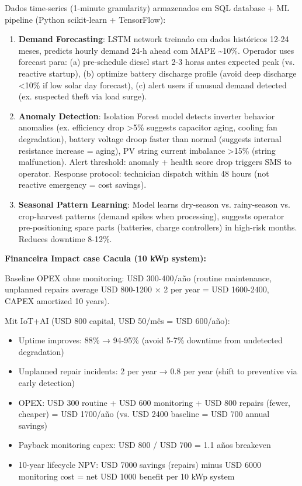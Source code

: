 \documentclass[12pt, a4paper]{article}
\begin{document}
Dados time-series (1-minute granularity) armazenados em SQL database + ML pipeline (Python scikit-learn + TensorFlow):
\begin{enumerate}
\item\textbf{Demand Forecasting}: LSTM network treinado em dados históricos 12-24 meses, predicts hourly demand 24-h ahead com MAPE \textasciitilde{}10\%. Operador uses forecast para: (a) pre-schedule diesel start 2-3 horas antes expected peak (vs. reactive startup), (b) optimize battery discharge profile (avoid deep discharge <10\% if low solar day forecast), (c) alert users if unusual demand detected (ex. suspected theft via load surge).

\item\textbf{Anomaly Detection}: Isolation Forest model detects inverter behavior anomalies (ex. efficiency drop >5\% suggests capacitor aging, cooling fan degradation), battery voltage droop faster than normal (suggests internal resistance increase = aging), PV string current imbalance >15\% (string malfunction). Alert threshold: anomaly + health score drop triggers SMS to operator. Response protocol: technician dispatch within 48 hours (not reactive emergency = cost savings).

\item\textbf{Seasonal Pattern Learning}: Model learns dry-season vs. rainy-season vs. crop-harvest patterns (demand spikes when processing), suggests operator pre-positioning spare parts (batteries, charge controllers) in high-risk months. Reduces downtime 8-12\%.
\end{enumerate}\textbf{Financeira Impact case Cacula (10 kWp system):}

Baseline OPEX ohne monitoring: USD 300-400/año (routine maintenance, unplanned repairs average USD 800-1200 × 2 per year = USD 1600-2400, CAPEX amortized 10 years). 

Mit IoT+AI (USD 800 capital, USD 50/mês = USD 600/año):
\begin{itemize}
\item Uptime improves: 88\% → 94-95\% (avoid 5-7\% downtime from undetected degradation)
\item Unplanned repair incidents: 2 per year → 0.8 per year (shift to preventive via early detection)
\item OPEX: USD 300 routine + USD 600 monitoring + USD 800 repairs (fewer, cheaper) = USD 1700/año (vs. USD 2400 baseline = USD 700 annual savings)
\item Payback monitoring capex: USD 800 / USD 700 = 1.1 años breakeven
\item 10-year lifecycle NPV: USD 7000 savings (repairs) minus USD 6000 monitoring cost = net USD 1000 benefit per 10 kWp system
\end{itemize}
\end{document}
